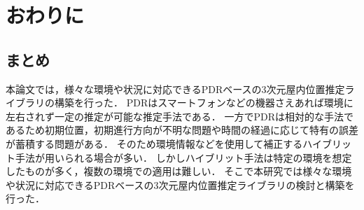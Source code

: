 \chapter{おわりに}
\thispagestyle{myheadings}


%
%
%
%



\section{まとめ}

本論文では，様々な環境や状況に対応できるPDRベースの3次元屋内位置推定ライブラリの構築を行った．
PDRはスマートフォンなどの機器さえあれば環境に左右されず一定の推定が可能な推定手法である．
一方でPDRは相対的な手法であるため初期位置，初期進行方向が不明な問題や時間の経過に応じて特有の誤差が蓄積する問題がある．
そのため環境情報などを使用して補正するハイブリット手法が用いられる場合が多い．
しかしハイブリット手法は特定の環境を想定したものが多く，複数の環境での適用は難しい．
そこで本研究では様々な環境や状況に対応できるPDRベースの3次元屋内位置推定ライブラリの検討と構築を行った．

